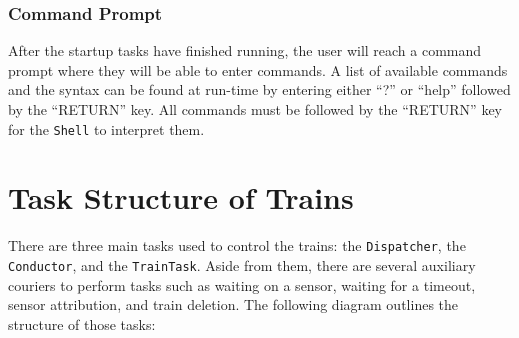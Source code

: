 \documentclass[12pt]{article}
\begin{document}
\subsubsection{Command Prompt}
After the startup tasks have finished running, the user will reach a command prompt where they will be able to enter commands.  A list of available commands and the syntax can be found at run-time by entering either ``?'' or ``help'' followed by the ``RETURN'' key.  All commands must be followed by the ``RETURN'' key for the {\tt Shell} to interpret them.
\\[2\baselineskip]
\section{Task Structure of Trains}
There are three main tasks used to control the trains: the \texttt{Dispatcher}, the \texttt{Conductor}, and the \texttt{TrainTask}.  Aside from them,
there are several auxiliary couriers to perform tasks such as waiting on a sensor, waiting for a timeout, sensor attribution,
and train deletion.  The following diagram outlines the structure of those tasks:
\end{document}

